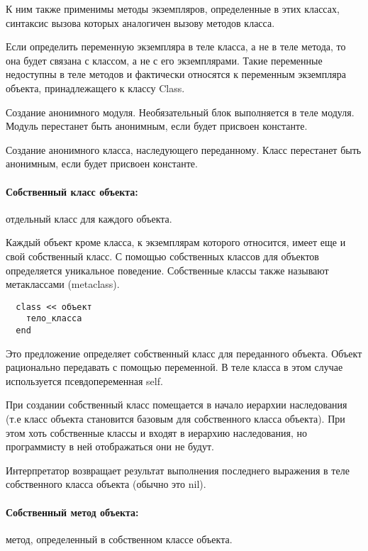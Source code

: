 К ним также применимы методы экземпляров, определенные в этих классах, синтаксис вызова которых аналогичен вызову методов класса. 

Если определить переменную экземпляра в теле класса, а не в теле метода, то она будет связана с классом, а не с его экземплярами. Такие переменные недоступны в теле методов и фактически относятся к переменным экземпляра объекта, принадлежащего к классу Class.

\begin{methodlist}
  Создание анонимного модуля. Необязательный блок выполняется в теле модуля. Модуль перестанет быть анонимным, если будет присвоен константе. 

  Создание анонимного класса, наследующего переданному. Класс перестанет быть анонимным, если будет присвоен константе.
\end{methodlist}

\paragraph*{Собственный класс объекта:} отдельный класс для каждого объекта.

Каждый объект кроме класса, к экземплярам которого относится, имеет еще и свой собственный класс. С помощью собственных классов для объектов определяется уникальное поведение. Собственные классы также называют метаклассами (metaclass).
\begin{verbatim}
  class << объект
    тело_класса
  end
\end{verbatim}

Это предложение определяет собственный класс для переданного объекта. Объект рационально передавать с помощью переменной. В теле класса в этом случае используется псевдопеременная self.

При создании собственный класс помещается в начало иерархии наследования (т.е класс объекта становится базовым для собственного класса объекта). При этом хоть собственные классы и входят в иерархию наследования, но программисту в ней отображаться они не будут.

Интерпретатор возвращает результат выполнения последнего выражения в теле собственного класса объекта (обычно это nil).

\paragraph*{Собственный метод объекта:} метод, определенный в собственном классе объекта.

